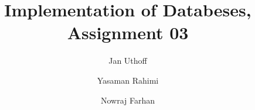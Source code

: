 \documentclass{exercisesheet}
\title{Implementation of Databeses, Assignment 03}
\author{
    Jan Uthoff
    \and
    Yasaman Rahimi
    \and
    Nowraj Farhan
}
\begin{document}
\maketitle

\pointtable


\end{document}
